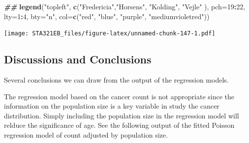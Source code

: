 \documentclass[
]{book}
\newenvironment{Shaded}{\begin{snugshade}}{\end{snugshade}}
\newcommand{\AttributeTok}[1]{\textcolor[rgb]{0.13,0.29,0.53}{#1}}
\newcommand{\DecValTok}[1]{\textcolor[rgb]{0.00,0.00,0.81}{#1}}
\newcommand{\DocumentationTok}[1]{\textcolor[rgb]{0.56,0.35,0.01}{\textbf{\textit{#1}}}}
\newcommand{\FunctionTok}[1]{\textcolor[rgb]{0.13,0.29,0.53}{\textbf{#1}}}
\newcommand{\NormalTok}[1]{#1}
\newcommand{\OtherTok}[1]{\textcolor[rgb]{0.56,0.35,0.01}{#1}}
\newcommand{\SpecialCharTok}[1]{\textcolor[rgb]{0.81,0.36,0.00}{\textbf{#1}}}
\newcommand{\StringTok}[1]{\textcolor[rgb]{0.31,0.60,0.02}{#1}}
\begin{document}
\begin{Shaded}
\begin{Highlighting}[]
\DocumentationTok{\#\#}
\FunctionTok{legend}\NormalTok{(}\StringTok{"topleft"}\NormalTok{, }\FunctionTok{c}\NormalTok{(}\StringTok{"Fredericia"}\NormalTok{,}\StringTok{"Horsens"}\NormalTok{, }\StringTok{"Kolding"}\NormalTok{, }\StringTok{"Vejle"}\NormalTok{ ),}
                  \AttributeTok{pch=}\DecValTok{19}\SpecialCharTok{:}\DecValTok{22}\NormalTok{, }\AttributeTok{lty=}\DecValTok{1}\SpecialCharTok{:}\DecValTok{4}\NormalTok{,  }\AttributeTok{bty=}\StringTok{"n"}\NormalTok{, }
        \AttributeTok{col=}\FunctionTok{c}\NormalTok{(}\StringTok{"red"}\NormalTok{, }\StringTok{"blue"}\NormalTok{, }\StringTok{"purple"}\NormalTok{, }\StringTok{"mediumvioletred"}\NormalTok{))}
\end{Highlighting}
\end{Shaded}

\texttt{[image: STA321EB\_files/figure-latex/unnamed-chunk-147-1.pdf]}

\hypertarget{discussions-and-conclusions}{%
\subsection{Discussions and Conclusions}\label{discussions-and-conclusions}}

Several conclusions we can draw from the output of the regression models.

The regression model based on the cancer count is not appropriate since the information on the population size is a key variable in study the cancer distribution. Simply including the population size in the regression model will relduce the significance of age. See the following output of the fitted Poisson regression model of count adjusted by population size.

\begin{Shaded}
\end{Shaded}
\end{document}
